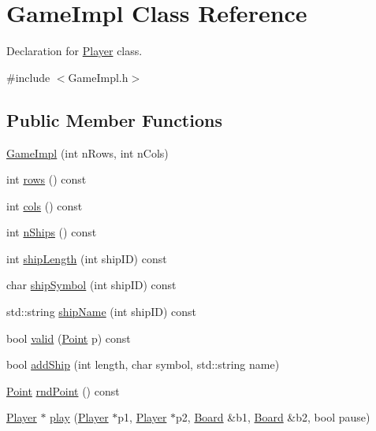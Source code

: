 \hypertarget{class_game_impl}{}\section{Game\+Impl Class Reference}
\label{class_game_impl}


Declaration for \mbox{\hyperlink{class_player}{Player}} class.  




{\ttfamily \#include $<$Game\+Impl.\+h$>$}

\subsection*{Public Member Functions}
\begin{DoxyCompactItemize}
\item 
\mbox{\hyperlink{class_game_impl_a1ec88dfb57e180ee008cff4cf10934bf}{Game\+Impl}} (int n\+Rows, int n\+Cols)
\item 
int \mbox{\hyperlink{class_game_impl_a705c32b11b7cfaf9e8fd442c6434f7df}{rows}} () const
\item 
int \mbox{\hyperlink{class_game_impl_a73a94a0378afbe0ae9369afcdabc51ab}{cols}} () const
\item 
int \mbox{\hyperlink{class_game_impl_a15bfe27ab66ca758afaed1cc805c2f10}{n\+Ships}} () const
\item 
int \mbox{\hyperlink{class_game_impl_aa3b7b99102e9bcb3c9d06a1d3c672dc0}{ship\+Length}} (int ship\+ID) const
\item 
char \mbox{\hyperlink{class_game_impl_a1138859824715420317de50ffb15fdb9}{ship\+Symbol}} (int ship\+ID) const
\item 
std\+::string \mbox{\hyperlink{class_game_impl_ad39261b5f7198a6bacf99188e1108a50}{ship\+Name}} (int ship\+ID) const
\item 
bool \mbox{\hyperlink{class_game_impl_adae52d5fa830b6f0f0585e24cde3af3b}{valid}} (\mbox{\hyperlink{class_point}{Point}} p) const
\item 
bool \mbox{\hyperlink{class_game_impl_a181c0a610e9d11739dd1a96a73703103}{add\+Ship}} (int length, char symbol, std\+::string name)
\item 
\mbox{\hyperlink{class_point}{Point}} \mbox{\hyperlink{class_game_impl_a647d740893579abd77cc1d58ac600da7}{rnd\+Point}} () const
\item 
\mbox{\hyperlink{class_player}{Player}} $\ast$ \mbox{\hyperlink{class_game_impl_adf2cc88e7c3f617a7033512d05a6ba0c}{play}} (\mbox{\hyperlink{class_player}{Player}} $\ast$p1, \mbox{\hyperlink{class_player}{Player}} $\ast$p2, \mbox{\hyperlink{class_board}{Board}} \&b1, \mbox{\hyperlink{class_board}{Board}} \&b2, bool pause)
\end{DoxyCompactItemize}


